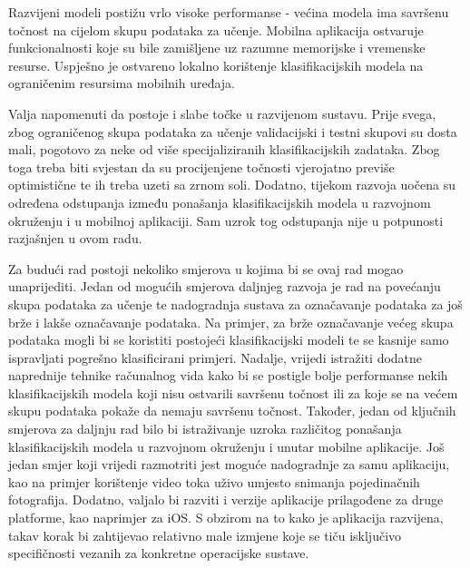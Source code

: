 \documentclass[diplomskirad]{fer}
\begin{document}
	Razvijeni modeli postižu vrlo visoke performanse - većina modela ima savršenu točnost na cijelom skupu podataka za učenje. Mobilna aplikacija ostvaruje funkcionalnosti koje su bile zamišljene uz razumne memorijske i vremenske resurse. Uspješno je ostvareno lokalno korištenje klasifikacijskih modela na ograničenim resursima mobilnih uređaja.
	
	Valja napomenuti da postoje i slabe točke u razvijenom sustavu. Prije svega, zbog ograničenog skupa podataka za učenje validacijski i testni skupovi su dosta mali, pogotovo za neke od više specijaliziranih klasifikacijskih zadataka. Zbog toga treba biti svjestan da su procijenjene točnosti vjerojatno previše optimistične te ih treba uzeti sa zrnom soli. Dodatno, tijekom razvoja uočena su određena odstupanja između ponašanja klasifikacijskih modela u razvojnom okruženju i u mobilnoj aplikaciji. Sam uzrok tog odstupanja nije u potpunosti razjašnjen u ovom radu.
	
	Za budući rad postoji nekoliko smjerova u kojima bi se ovaj rad mogao unaprijediti. Jedan od mogućih smjerova daljnjeg razvoja je rad na povećanju skupa podataka za učenje te nadogradnja sustava za označavanje podataka za još brže i lakše označavanje podataka. Na primjer, za brže označavanje većeg skupa podataka mogli bi se koristiti postojeći klasifikacijski modeli te se kasnije samo ispravljati pogrešno klasificirani primjeri. Nadalje, vrijedi istražiti dodatne naprednije tehnike računalnog vida kako bi se postigle bolje performanse nekih klasifikacijskih modela koji nisu ostvarili savršenu točnost ili za koje se na većem skupu podataka pokaže da nemaju savršenu točnost. Također, jedan od ključnih smjerova za daljnju rad bilo bi istraživanje uzroka različitog ponašanja klasifikacijskih modela u razvojnom okruženju i unutar mobilne aplikacije. Još jedan smjer koji vrijedi razmotriti jest moguće nadogradnje za samu aplikaciju, kao na primjer korištenje video toka uživo umjesto snimanja pojedinačnih fotografija. Dodatno, valjalo bi razviti i verzije aplikacije prilagođene za druge platforme, kao naprimjer za iOS. S obzirom na to kako je aplikacija razvijena, takav korak bi zahtijevao relativno male izmjene koje se tiču isključivo specifičnosti vezanih za konkretne operacijske sustave.



\end{document}
